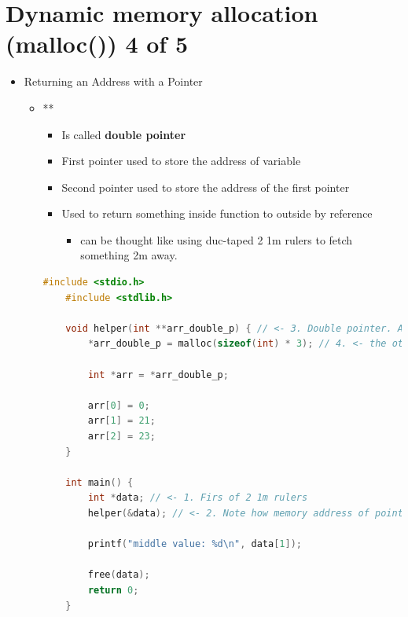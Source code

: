 \documentclass[12pt]{article}
\begin{document}
\bigskip

\section*{Dynamic memory allocation (malloc()) 4 of 5}

\bigskip


\begin{itemize}
    \item Returning an Address with a Pointer
    \begin{itemize}
        \item **
        \begin{itemize}
        \item Is called \textbf{double pointer}
        \item First pointer used to store the address of variable
        \item Second pointer used to store the address of the first pointer
        \item Used to return something inside function to outside by reference
        \begin{itemize}
            \item can be thought like using duc-taped 2 1m rulers to fetch something 2m away.
        \end{itemize}
    \end{itemize}

    \begin{lstlisting}[language=c,caption={dynamic\_mem\_example\_4.c}]
    #include <stdio.h>
    #include <stdlib.h>

    void helper(int **arr_double_p) { // <- 3. Double pointer. Another duc-taping.
        *arr_double_p = malloc(sizeof(int) * 3); // 4. <- the other end of 2 1m rulers

        int *arr = *arr_double_p;

        arr[0] = 0;
        arr[1] = 21;
        arr[2] = 23;
    }

    int main() {
        int *data; // <- 1. Firs of 2 1m rulers
        helper(&data); // <- 2. Note how memory address of pointer is passed. Think of this as ductaping

        printf("middle value: %d\n", data[1]);

        free(data);
        return 0;
    }
    \end{lstlisting}
    \end{itemize}
\end{itemize}
\end{document}
